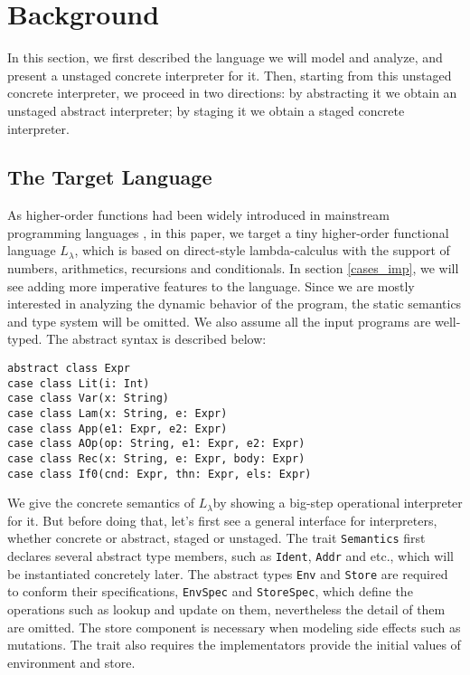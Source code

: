 \newcommand{\TLang}{$L_\lambda$}

\section{Background}

In this section, we first described the language we will model and analyze, and present a unstaged concrete 
interpreter for it. Then, starting from this unstaged concrete interpreter, we proceed in two directions:
by abstracting it we obtain an unstaged abstract interpreter; by staging it we obtain a staged concrete
interpreter.

\subsection{The Target Language} \label{bg_lang}

As higher-order functions had been widely introduced in mainstream programming languages , in this paper, 
we target a tiny higher-order functional language \TLang, which is based on direct-style lambda-calculus
with the support of numbers, arithmetics, recursions and conditionals.
In section \ref{cases_imp}, we will see adding more imperative features to the language.
Since we are mostly interested in analyzing the dynamic behavior of the program, the static semantics and
type system will be omitted. We also assume all the input programs are well-typed.
The abstract syntax is described below:

\begin{lstlisting}
abstract class Expr
case class Lit(i: Int)
case class Var(x: String)
case class Lam(x: String, e: Expr)
case class App(e1: Expr, e2: Expr)
case class AOp(op: String, e1: Expr, e2: Expr)
case class Rec(x: String, e: Expr, body: Expr)
case class If0(cnd: Expr, thn: Expr, els: Expr)
\end{lstlisting}

We give the concrete semantics of \TLang by showing a big-step operational interpreter for it.
But before doing that, let's first see a general interface for interpreters, whether concrete or abstract, 
staged or unstaged. The trait \texttt{Semantics} first declares several abstract type members, such as \texttt{Ident},
\texttt{Addr} and etc., which will be instantiated concretely later. The abstract types \texttt{Env} and \texttt{Store}
are required to conform their specifications, \texttt{EnvSpec} and \texttt{StoreSpec}, which define 
the operations such as lookup and update on them, nevertheless the detail of them are omitted.  
The store component is necessary when modeling side effects such as mutations. 
The trait also requires the implementators provide the initial values of environment and store.

